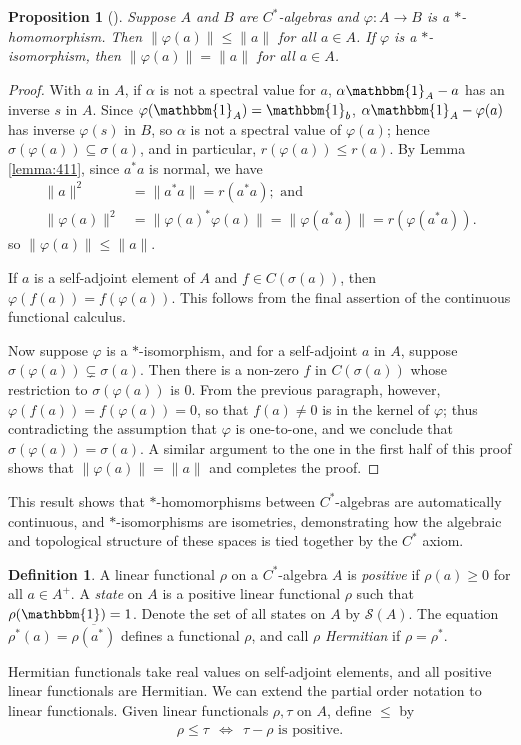 \documentclass[12pt,a4paper]{report}
\theoremstyle{plain}
\newtheorem{prop}{Proposition}
\theoremstyle{definition}
\newtheorem{defn}{Definition}
\newcommand{\1}{\mathbbm{1}}
\renewcommand{\phi}{\varphi}
\renewcommand{\S}{\mathscr{S}}
\newcommand{\spec}[1]{\sigma(#1)}
\renewcommand{\bar}{\overline}
\begin{document}
\begin{prop}[{\cite[4.1.8]{kadison83}}] \label{prop:homo}
	Suppose $A$ and $B$ are $C^\ast$-algebras and $\phi:A\to B$ is a $\ast$-homomorphism. Then
	$\|\phi(a)\| \leq \|a\|$ for all $a \in A$. If $\phi$ is a $\ast$-isomorphism, then
	$\|\phi(a)\| = \|a\|$ for all $a \in A$.
\end{prop}
\begin{proof}
	With $a$ in $A$, if $\alpha$ is not a spectral value for $a$, $\alpha\1_A-a$ has an inverse $s$ in 
	$A$. Since $\phi(\1_A) =\1_b$, $\alpha \1_A-\phi(a)$ has inverse $\phi(s)$ in $B$, so $\alpha$ is 
	not a spectral value of $\phi(a)$; hence $\spec {\phi(a)}\subseteq \spec a$, and in particular, 
	$r(\phi(a))\leq r(a)$. By Lemma \ref{lemma:411}, since $a^\ast a$ is normal, we have 
	\begin{align*}
		\|a\|^2			&=	\|a^\ast a\| 	= 	r(a^\ast a); 	\mbox{ and }	\\
		\|\phi(a)\|^2 &=\|\phi(a)^\ast\phi(a)\| = 
							 \|\phi(a^\ast a)\| = r(\phi(a^\ast a)).
	\end{align*}
	so $\|\phi(a)\|\leq \|a\|$.
	
	If $a$ is a self-adjoint element of $A$ and $f \in C(\spec a)$, then $\phi(f(a))=f(\phi(a))$. This 
	follows from the final assertion of the continuous functional calculus.
	
	Now suppose $\phi$ is a $\ast$-isomorphism, and for a self-adjoint $a$ in $A$, suppose $
	\spec{\phi(a)} \subsetneq \spec a$. Then there is a non-zero $f$ in $C(\spec a)$ whose restriction 
	to $\spec{\phi(a)}$ is 0. From the previous paragraph, however, $\phi(f(a))=f(\phi(a))=0$, so that 
	$f(a)\not= 0$ is in the kernel of $\phi$; thus contradicting the assumption that $\phi$ is 
	one-to-one, and we conclude that $\spec{\phi(a)} = \spec a$. A similar argument to the one in the 
	first half of this proof shows that $\|\phi(a)\|=\|a\|$ and completes the proof.
\end{proof}
This result shows that $\ast$-homomorphisms between $C^\ast$-algebras are automatically continuous, and $\ast$-isomorphisms are isometries, demonstrating how the algebraic and topological structure of these spaces is tied together by the $C^\ast$ axiom.

\begin{defn}
	A linear functional $\rho$ on a $C^\ast$-algebra $A$ is \emph{positive} if $\rho(a)\geq 0$ for all 
	$a\in A^+$. A \emph{state} on $A$ is a positive linear functional $\rho$ such that $\rho(\1)=1$. 
	Denote the set of all states on $A$ by $\S(A)$. 
	The equation $\rho^\ast(a) =\bar{\rho(a^\ast)}$ defines a functional $\rho$, and call $\rho$ 
	\emph{Hermitian} if $\rho=\rho^\ast$.
\end{defn}
Hermitian functionals take real values on self-adjoint elements, and all positive linear functionals are 
Hermitian.
We can extend the partial order notation to linear functionals. Given linear functionals $\rho,\tau$ on 
$A$, define $\leq$ by
\begin{align*}
	\rho \leq \tau ~~\iff~~ \tau - \rho \mbox{ is positive}.
\end{align*}
\end{document}
